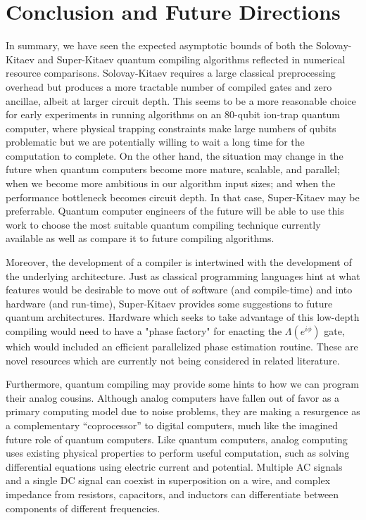 \section{Conclusion and Future Directions}

In summary, we have seen the expected asymptotic bounds of both the
Solovay-Kitaev and Super-Kitaev quantum compiling algorithms reflected in
numerical resource comparisons. Solovay-Kitaev requires a large classical
preprocessing overhead but produces a more tractable number of compiled
gates and zero ancillae, albeit at larger circuit depth. This seems to be
a more reasonable choice for early experiments in running algorithms on an
80-qubit ion-trap quantum computer, where physical trapping constraints
make large numbers of qubits problematic but we are potentially willing to
wait a long time for the computation to complete. On the other hand, the
situation may change in the future when
quantum computers become more mature, scalable, and parallel;
when we become more ambitious in our
algorithm input sizes; and when the performance bottleneck becomes circuit depth.
In that case, Super-Kitaev may be preferrable.
Quantum computer engineers of the future will be able to use this work to
choose the most suitable quantum compiling technique currently available
as well as compare it to future compiling algorithms.

Moreover, the development of a compiler is intertwined with the
development of the underlying architecture. Just as classical programming
languages hint at what features would be desirable to move out of software
(and compile-time)
and into hardware (and run-time), Super-Kitaev provides some suggestions
to future quantum architectures. Hardware which seeks to take advantage of
this low-depth compiling would need to have a
"phase factory" for enacting the $\Lambda(e^{i\phi})$ gate, which would
included an efficient parallelized phase estimation routine. These are
novel resources which are currently not being considered in related literature.

Furthermore, quantum compiling may provide some hints to how we can program
their analog cousins. Although analog computers have fallen out of
favor as a primary computing model due to noise problems, they are making a
resurgence as a complementary ``coprocessor'' to digital computers, much like
the imagined future role of quantum computers. Like quantum computers,
analog computing uses existing physical properties to perform useful
computation, such as solving differential equations using electric current
and potential. Multiple AC signals and a single DC signal can coexist
in superposition on a wire,
and complex impedance from resistors, capacitors, and inductors
can differentiate between components of different frequencies.

